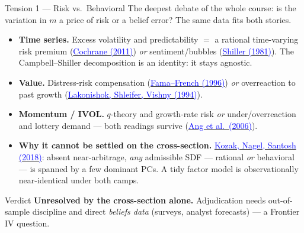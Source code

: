 \documentclass{beamer}
\begin{document}
\begin{frame}{Tension 1 --- Risk vs.\ Behavioral}
The deepest debate of the whole course: is the variation in $m$ a \alert{price of risk} or a \alert{belief error}? The same data fits both stories.
\begin{itemize}
  \item \textbf{Time series.} Excess volatility and predictability $=$ a rational time-varying risk premium (\href{https://onlinelibrary.wiley.com/doi/10.1111/j.1540-6261.2011.01671.x}{\textcolor{blue}{Cochrane (2011)}}) \emph{or} sentiment/bubbles (\href{http://www.jstor.org/stable/1802789}{\textcolor{blue}{Shiller (1981)}}). The Campbell--Shiller decomposition is an identity: it stays agnostic.
  \item \textbf{Value.} Distress-risk compensation (\href{https://doi.org/10.1111/j.1540-6261.1996.tb05202.x}{\textcolor{blue}{Fama--French (1996)}}) \emph{or} overreaction to past growth (\href{https://doi.org/10.1111/j.1540-6261.1994.tb04772.x}{\textcolor{blue}{Lakonishok, Shleifer, Vishny (1994)}}).
  \item \textbf{Momentum / IVOL.} $q$-theory and growth-rate risk \emph{or} under/overreaction and lottery demand --- both readings survive (\href{https://doi.org/10.1111/j.1540-6261.2006.00836.x}{\textcolor{blue}{Ang et al.\ (2006)}}).
  \item \textbf{Why it cannot be settled on the cross-section.} \href{https://doi.org/10.1111/jofi.12612}{\textcolor{blue}{Kozak, Nagel, Santosh (2018)}}: absent near-arbitrage, \emph{any} admissible SDF --- rational \emph{or} behavioral --- is spanned by a few dominant PCs. A tidy factor model is observationally near-identical under both camps.
\end{itemize}
\begin{block}{Verdict}
\textbf{Unresolved by the cross-section alone.} Adjudication needs out-of-sample discipline and direct \emph{beliefs data} (surveys, analyst forecasts) --- a Frontier IV question.
\end{block}
\end{frame}
\end{document}
